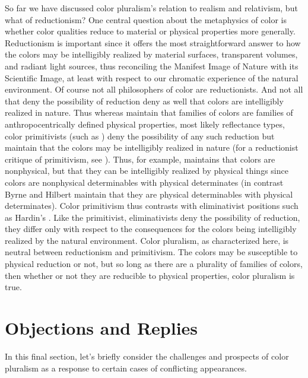 \documentclass[12pt]{article}
\begin{document}
So far we have discussed color pluralism's relation to realism and relativism, but what of reductionism? One central question about the metaphysics of color is whether color qualities reduce to material or physical properties more generally. Reductionism is important since it offers the most straightforward answer to how the colors may be intelligibly realized by material surfaces, transparent volumes, and radiant light sources, thus reconciling the Manifest Image of Nature with its Scientific Image, at least with respect to our chromatic experience of the natural environment. Of course not all philosophers of color are reductionists. And not all that deny the possibility of reduction deny as well that colors are intelligibly realized in nature. Thus whereas \citet{Hilbert:1987jq,Byrne:1997dk,Byrne:2003we} maintain that families of colors are families of anthropocentrically defined physical properties, most likely reflectance types, color primitivists (such as \citealt{Campbell:1997dq,Broackes:1997pa,McGinn:1996oe,Yablo:1995fk,Gert:2008ge,Allen:2011bs}) deny the possibility of any such reduction but maintain that the colors may be intelligibly realized in nature (for a reductionist critique of primitivism, see \citealt{Byrne:2006bh}). Thus, for example, \citet{Yablo:1995fk} maintains that colors are nonphysical, but that they can be intelligibly realized by physical things since colors are nonphysical determinables with physical determinates (in contrast Byrne and Hilbert maintain that they are physical determinables with physical determinates). Color primitivism thus contrasts with eliminativist positions such as Hardin's \citeyearpar{Hardin:1993kn}. Like the primitivist, eliminativists deny the possibility of reduction, they differ only with respect to the consequences for the colors being intelligibly realized by the natural environment. Color pluralism, as characterized here, is neutral between reductionism and primitivism. The colors may be susceptible to physical reduction or not, but so long as there are a plurality of families of colors, then whether or not they are reducible to physical properties, color pluralism is true.


\section{Objections and Replies} %
\label{sec:objections_and_replies}

In this final section, let's briefly consider the challenges and prospects of color pluralism as a response to certain cases of conflicting appearances.
\end{document}
